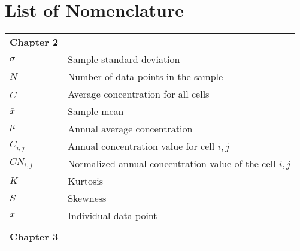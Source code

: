 \chapter*{List of Nomenclature}

\ssp
\small

\begin{longtable}{ll}
\textbf{Chapter 2}\\

$\sigma$ & Sample standard deviation \\
$N$ & Number of data points in the sample \\
$\bar{C}$ & Average concentration for all cells \\
$\bar{x}$ & Sample mean \\
$\mu$ & Annual average concentration \\
$C_{i,j}$ & Annual concentration value for cell $i, j$ \\
$CN_{i,j}$ & Normalized annual concentration value of the cell $i, j$ \\
$K$ & Kurtosis \\
$S$ & Skewness \\
$x$ & Individual data point \\
\\
\bigskip
\textbf{Chapter 3}\\


\end{longtable}
